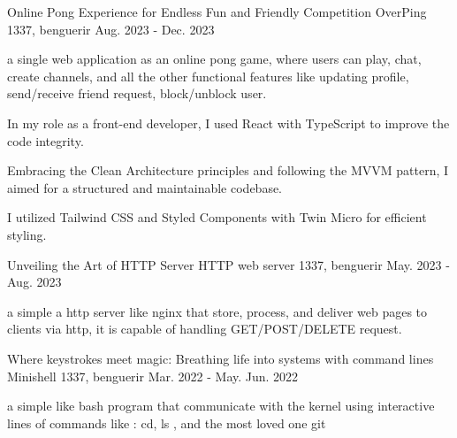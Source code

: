 

\begin{cventries}


  \cventry
    {Online Pong Experience for Endless Fun and Friendly Competition} %
    {OverPing} %
    {1337, benguerir} %
    {Aug. 2023 - Dec. 2023} %
    {
      \begin{cvitems} %
        \item {a single web application as an online pong game, where users can play,
chat, create channels, and all the other functional features like
updating profile, send/receive friend request, block/unblock user.}
        \item {In my role as a front-end developer, I used React with TypeScript to
improve the code integrity.}
        \item {Embracing the Clean Architecture
principles and following the MVVM pattern, I aimed for a structured
and maintainable codebase.}
        \item {I utilized Tailwind CSS and
Styled Components with Twin Micro for efficient styling.}
      \end{cvitems}
    }

  \cventry
    {Unveiling the Art of HTTP Server} %
    {HTTP web server} %
    {1337, benguerir} %
    {May. 2023 - Aug. 2023} %
    {
      \begin{cvitems} %
        \item {a simple a http server like nginx that store, process, and deliver web
pages to clients via http, it is capable of handling GET/POST/DELETE
request.}
      \end{cvitems}
    }

  \cventry
    {Where keystrokes meet magic: Breathing life into systems with command lines} %
    {Minishell} %
    {1337, benguerir} %
    {Mar. 2022 - May. Jun. 2022} %
    {
      \begin{cvitems} %
        \item {a simple like bash program that communicate with the kernel using
interactive lines of commands like : cd, ls , and the most loved one git}
      \end{cvitems}
    }


\end{cventries}
